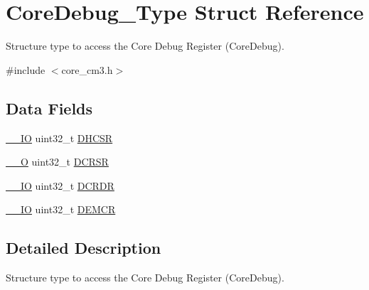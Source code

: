 \hypertarget{struct_core_debug___type}{\section{Core\-Debug\-\_\-\-Type Struct Reference}
\label{struct_core_debug___type}
}


Structure type to access the Core Debug Register (Core\-Debug).  




{\ttfamily \#include $<$core\-\_\-cm3.\-h$>$}

\subsection*{Data Fields}
\begin{DoxyCompactItemize}
\item 
\hyperlink{group___c_m_s_i_s__core__definitions_gaec43007d9998a0a0e01faede4133d6be}{\-\_\-\-\_\-\-I\-O} uint32\-\_\-t \hyperlink{struct_core_debug___type_a39bc5e68dc6071187fbe2348891eabfa}{D\-H\-C\-S\-R}
\item 
\hyperlink{group___c_m_s_i_s__core__definitions_ga7e25d9380f9ef903923964322e71f2f6}{\-\_\-\-\_\-\-O} uint32\-\_\-t \hyperlink{struct_core_debug___type_a7b49cb58573da77cc8a83a1b21262180}{D\-C\-R\-S\-R}
\item 
\hyperlink{group___c_m_s_i_s__core__definitions_gaec43007d9998a0a0e01faede4133d6be}{\-\_\-\-\_\-\-I\-O} uint32\-\_\-t \hyperlink{struct_core_debug___type_a5bcffe99d1d5471d5e5befbc6272ebf0}{D\-C\-R\-D\-R}
\item 
\hyperlink{group___c_m_s_i_s__core__definitions_gaec43007d9998a0a0e01faede4133d6be}{\-\_\-\-\_\-\-I\-O} uint32\-\_\-t \hyperlink{struct_core_debug___type_a6cdfc0a6ce3e988cc02c2d6e8107d193}{D\-E\-M\-C\-R}
\end{DoxyCompactItemize}


\subsection{Detailed Description}
Structure type to access the Core Debug Register (Core\-Debug). 

